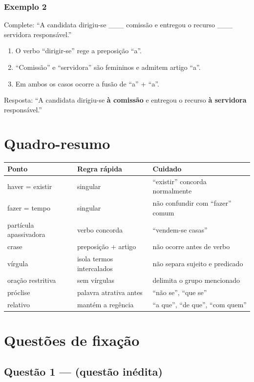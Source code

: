 \documentclass[11pt,a4paper]{article}
\begin{document}
\subsubsection*{Exemplo 2}

Complete: “A candidata dirigiu-se \_\_\_ comissão e entregou o recurso \_\_\_ servidora responsável.”

\begin{enumerate}
  \item O verbo “dirigir-se” rege a preposição “a”.
  \item “Comissão” e “servidora” são femininos e admitem artigo “a”.
  \item Em ambos os casos ocorre a fusão de “a” + “a”.
\end{enumerate}

Resposta: “A candidata dirigiu-se \textbf{à comissão} e entregou o recurso \textbf{à servidora} responsável.”

\section*{Quadro-resumo}

\begin{tabularx}{\linewidth}{llX}
\toprule
 \textbf{Ponto} & \textbf{Regra rápida} & \textbf{Cuidado} \\
\midrule
 haver = existir & singular & “existir” concorda normalmente \\
 fazer = tempo & singular & não confundir com “fazer” comum \\
 partícula apassivadora & verbo concorda & “vendem-se casas” \\
 crase & preposição + artigo & não ocorre antes de verbo \\
 vírgula & isola termos intercalados & não separa sujeito e predicado \\
 oração restritiva & sem vírgulas & delimita o grupo mencionado \\
 próclise & palavra atrativa antes & “não se”, “que se” \\
 relativo & mantém a regência & “a que”, “de que”, “com quem” \\
\bottomrule
\end{tabularx}


\section*{Questões de fixação}

\subsection*{Questão 1 — (questão inédita)}
\end{document}
